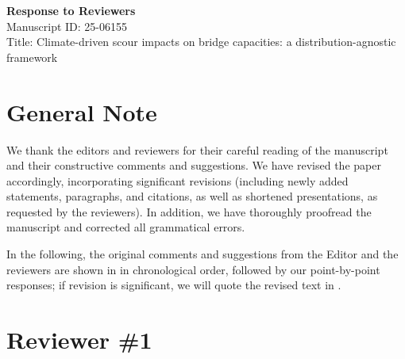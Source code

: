 \documentclass[12pt]{article}
\begin{document}
\begin{center}
    {\Large \textbf{Response to Reviewers}}\\[1em]
    Manuscript ID: 25-06155\\
    Title: Climate-driven scour impacts on bridge capacities: a distribution-agnostic framework
\end{center}


\doublespacing

\section*{General Note}
\RE We thank the editors and reviewers for their careful reading of the manuscript and their constructive comments and suggestions. We have revised the paper accordingly, incorporating significant revisions (including newly added statements, paragraphs, and citations, as well as shortened presentations, as requested by the reviewers). In addition, we have thoroughly proofread the manuscript and corrected all grammatical errors.

In the following, the original comments and suggestions from the Editor and the reviewers are shown in {} in chronological order, followed by our point-by-point responses; if revision is significant, we will quote the revised text in {}.

\newpage

\section*{Reviewer \#1}

\end{document}
